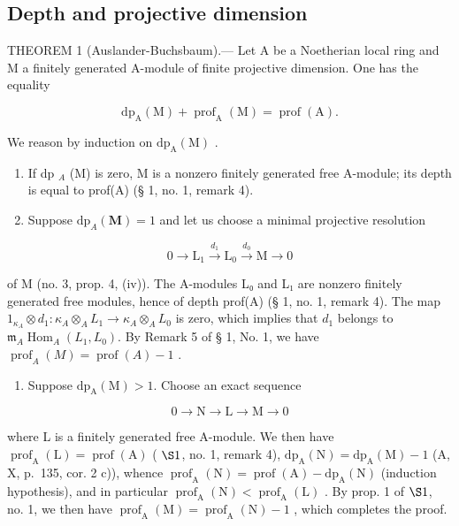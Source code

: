 \subsection{Depth and projective dimension}

THEOREM 1 (Auslander-Buchsbaum).--- Let A be a Noetherian local ring and M a finitely generated A-module of finite projective dimension. One has the equality

\[
\mathrm{dp} _ {\mathrm{A}} (\mathrm{M}) + \operatorname{prof} _ {\mathrm{A}} (\mathrm{M}) = \operatorname{prof} (\mathrm{A}).
\]

We reason by induction on \(\mathrm{dp}_{\mathrm{A}}(\mathrm{M})\) .

\begin{enumerate}
\def\labelenumi{\alph{enumi})}
\item
  If dp \(_{A}\) (M) is zero, M is a nonzero finitely generated free A-module; its depth is equal to prof(A) (§ 1, no. 1, remark 4).
\item
  Suppose \(\mathrm{dp}_{A}(\mathbf{M}) = 1\) and let us choose a minimal projective resolution
\end{enumerate}

\[
0 \to \mathrm{L} _ {1} \xrightarrow {d _ {1}} \mathrm{L} _ {0} \xrightarrow {d _ {0}} \mathrm{M} \to 0
\]

of M (no. 3, prop. 4, (iv)). The A-modules L₀ and L₁ are nonzero finitely generated free modules, hence of depth prof(A) (§ 1, no. 1, remark 4). The map \(1_{\kappa_{A}} \otimes d_{1} : \kappa_{A} \otimes_{A} L_{1} \longrightarrow \kappa_{A} \otimes_{A} L_{0}\) is zero, which implies that \(d_{1}\) belongs to \(\mathfrak{m}_{A} \operatorname{Hom}_{A}(L_{1}, L_{0})\). By Remark 5 of § 1, No. 1, we have \(\operatorname{prof}_{A}(M) = \operatorname{prof}(A) - 1\) .

\begin{enumerate}
\def\labelenumi{\alph{enumi})}
\setcounter{enumi}{2}
\tightlist
\item
  Suppose \(\mathrm{dp}_{\mathrm{A}}(\mathrm{M}) > 1\). Choose an exact sequence
\end{enumerate}

\[
0 \to \mathrm{N} \longrightarrow \mathrm{L} \longrightarrow \mathrm{M} \to 0
\]

where L is a finitely generated free A-module. We then have \(\operatorname{prof}_{\mathrm{A}}(\mathrm{L}) = \operatorname{prof}(\mathrm{A})\) ( \(\S 1\), no. 1, remark 4), \(\mathrm{dp}_{\mathrm{A}}(\mathrm{N}) = \mathrm{dp}_{\mathrm{A}}(\mathrm{M}) - 1\) (A, X, p.~135, cor. 2 c)), whence \(\operatorname{prof}_{\mathrm{A}}(\mathrm{N}) = \operatorname{prof}(\mathrm{A}) - \mathrm{dp}_{\mathrm{A}}(\mathrm{N})\) (induction hypothesis), and in particular \(\operatorname{prof}_{\mathrm{A}}(\mathrm{N}) < \operatorname{prof}_{\mathrm{A}}(\mathrm{L})\) . By prop. 1 of \(\S 1\), no. 1, we then have \(\operatorname{prof}_{\mathrm{A}}(\mathrm{M}) = \operatorname{prof}_{\mathrm{A}}(\mathrm{N}) - 1\) , which completes the proof.

